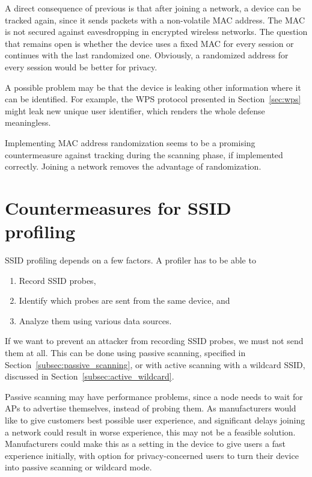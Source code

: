 \documentclass[12pt,a4paper,oneside,pdftex]{report}
\begin{document}
A direct consequence of previous is that after joining a network, a device can be tracked again, since it sends packets with a non-volatile MAC address. The MAC is not secured against eavesdropping in encrypted wireless networks. The question that remains open is whether the device uses a fixed MAC for every session or continues with the last randomized one. Obviously, a randomized address for every session would be better for privacy.

A possible problem may be that the device is leaking other information where it can be identified. For example, the WPS protocol presented in Section~\ref{sec:wps} might leak new unique user identifier, which renders the whole defense meaningless.

Implementing MAC address randomization seems to be a promising countermeasure against tracking during the scanning phase, if implemented correctly. Joining a network removes the advantage of randomization.

\section{Countermeasures for SSID profiling}
\label{sec:countermeasures_ssid}

SSID profiling depends on a few factors. A profiler has to be able to \begin{enumerate}
    \item Record SSID probes,
    \item Identify which probes are sent from the same device, and
    \item Analyze them using various data sources.
\end{enumerate}

If we want to prevent an attacker from recording SSID probes, we must not send them at all. This can be done using passive scanning, specified in Section~\ref{subsec:passive_scanning}, or with active scanning with a wildcard SSID, discussed in Section~\ref{subsec:active_wildcard}.

Passive scanning may have performance problems, since a node needs to wait for APs to advertise themselves, instead of probing them. As manufacturers would like to give customers best possible user experience, and significant delays joining a network could result in worse experience, this may not be a feasible solution. Manufacturers could make this as a setting in the device to give users a fast experience initially, with option for privacy-concerned users to turn their device into passive scanning or wildcard mode.
\end{document}
